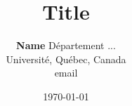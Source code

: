 \documentclass{article}
\title{Title}
\date{\today}
\author{
\textbf{Name} \And
\affiliations
Département ... \\
Université, Québec, Canada \\
\emails
email
}
\begin{document}
\newpage
\maketitle



\lipsum



\newpage
\printbibliography
\end{document}
